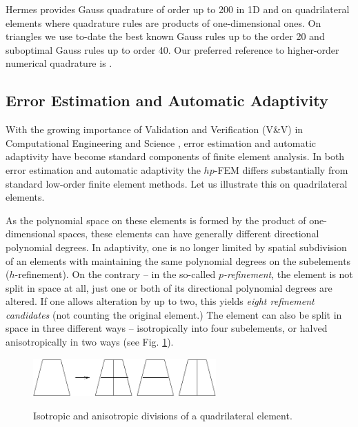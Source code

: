 \documentclass[final,3p,times,twocolumn]{elsarticle}
\begin{document}
Hermes provides Gauss quadrature of order up to 200 in 1D
and on quadrilateral elements where quadrature rules are 
products of one-dimensional ones. On triangles we use to-date 
the best known Gauss rules up to the order 20 and suboptimal 
Gauss rules up to order 40. Our preferred reference to 
higher-order numerical quadrature is \cite{cools}.

\subsection{Error Estimation and Automatic Adaptivity}\label{subsec:cand}

With the growing importance of Validation and
Verification (V\&V) in Computational Engineering and Science
\cite{v-v}, error estimation and automatic
adaptivity have become standard components of 
finite element analysis. 
In both error estimation and automatic adaptivity 
the $hp$-FEM differs substantially from standard 
low-order
finite element methods. Let us illustrate this 
on quadrilateral elements. 

As the polynomial
space on these elements is formed by the product 
of one-dimensional spaces, these elements 
can have generally different directional polynomial degrees. 
In adaptivity, one is no longer limited by spatial 
subdivision of an elements with maintaining the same 
polynomial degrees on the subelements ($h$-refinement). 
On the contrary -- in the so-called {\em $p$-refinement}, the element is not 
split in space at all, just one or both of its directional
polynomial degrees are altered. If one allows alteration by
up to two, this yields {\em eight refinement candidates}
(not counting the original element.) The element can also 
be split in space in three different ways -- isotropically 
into four subelements, or halved anisotropically in two ways
(see Fig. \ref{fig:quadsplit}).


\begin{figure}[!htb]
\begin{center}
 {
\includegraphics[width=7cm]{quad_split.pdf}
}
\end{center}
\vspace{-5mm}
\caption{Isotropic and anisotropic divisions of a quadrilateral element.}
\label{fig:quadsplit}
\end{figure}
\end{document}
